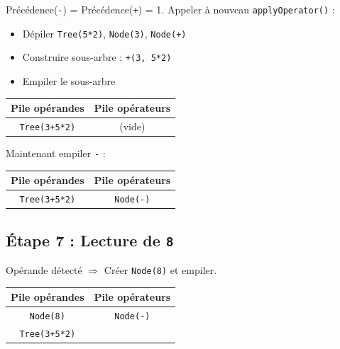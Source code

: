\documentclass[12pt,a4paper]{article}
\begin{document}
Précédence(\texttt{-}) = Précédence(\texttt{+}) = 1. Appeler à nouveau \texttt{applyOperator()} :
\begin{itemize}
    \item Dépiler \texttt{Tree(5*2)}, \texttt{Node(3)}, \texttt{Node(+)}
    \item Construire sous-arbre : \texttt{+(3, 5*2)}
    \item Empiler le sous-arbre
\end{itemize}

\begin{center}
\end{center}

\begin{center}
\begin{tabular}{|c|c|}
\hline
\textbf{Pile opérandes} & \textbf{Pile opérateurs} \\
\hline
\texttt{Tree(3+5*2)} & (vide) \\
\hline
\end{tabular}
\end{center}

Maintenant empiler \texttt{-} :

\begin{center}
\begin{tabular}{|c|c|}
\hline
\textbf{Pile opérandes} & \textbf{Pile opérateurs} \\
\hline
\texttt{Tree(3+5*2)} & \texttt{Node(-)} \\
\hline
\end{tabular}
\end{center}

\subsection{Étape 7 : Lecture de \texttt{8}}

Opérande détecté $\Rightarrow$ Créer \texttt{Node(8)} et empiler.

\begin{center}
\begin{tabular}{|c|c|}
\hline
\textbf{Pile opérandes} & \textbf{Pile opérateurs} \\
\hline
\texttt{Node(8)} & \texttt{Node(-)} \\
\texttt{Tree(3+5*2)} & \\
\hline
\end{tabular}
\end{center}
\end{document}

